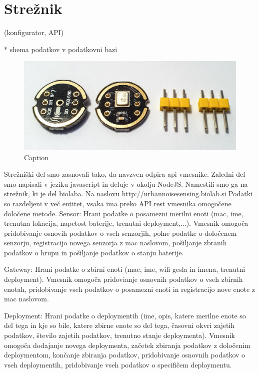 \documentclass[a4paper, 12pt]{book}
\begin{document}
\section{Strežnik}
(konfigurator, API)

* shema podatkov v podatkovni bazi
\begin{figure}[H]
    \centering
    \includegraphics[width=\linewidth]{slikovno_gradivo/INMP441_1.jpg}
    \caption{Caption}
    \label{fig:INMP441}
\end{figure}

Strežniški del smo zasnovali tako, da navzven odpira api vmesnike. 
Zaledni del smo napisali v jeziku javascript in deluje v okolju NodeJS. Namestili smo ga na strežnik, ki je del biolaba. Na naslovu http://urbannoisesensing.biolab.si
Podatki so razdeljeni v več entitet, vsaka ima preko API rest vmesnika omogočene določene metode.
Sensor:
Hrani podatke o posamezni merilni enoti (mac, ime, trenutna lokacija, napetost baterije, trenutni deployment,...). Vmesnik omogoča pridobivanje osnovih podatkov o vseh senzorjih, polne podatke o določenem senzorju, registracijo novega senzorja z mac naslovom, pošiljanje zbranih podatkov o hrupu in pošiljanje podatkov o stanju baterije.

Gateway:
Hrani podatke o zbirni enoti (mac, ime, wifi gesla in imena, trenutni deployment). Vmesnik omogoča pridovianje osnovnih podatkov o vseh zbirnih enotah, pridobivanje vseh podatkov o posamezni enoti in registracijo nove enote z mac naslovom. 

Deployment:
Hrani podatke o deploymentih (ime, opis, katere merilne enote so del tega in kje so bile, katere zbirne enote so del tega, časovni okvri zajetih podatkov, število zajetih podatkov, trenutno stanje deploymenta). Vmesnik omogoča dodajanje novega deploymenta, začetek zbiranja podatkov z določenim deploymentom, končanje zbiranja podatkov, pridobivanje osnovnih podatkov o vseh deploymentih, pridobivanje vseh podatkov o specifičem deploymentu.  
\end{document}
